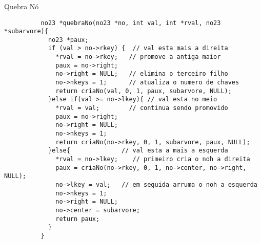 \documentclass[cyan,compress,aspectratio=43]{beamer}
\begin{document}
\begin{frame}[fragile]
\frametitle{}
      \vspace{-0.2cm}
	\begin{block}{Quebra Nó}
		\begin{lstlisting}
		  no23 *quebraNo(no23 *no, int val, int *rval, no23 *subarvore){
		    no23 *paux;
		    if (val > no->rkey) {  // val esta mais a direita
		      *rval = no->rkey;   // promove a antiga maior
		      paux = no->right;
		      no->right = NULL;   // elimina o terceiro filho
		      no->nkeys = 1;      // atualiza o numero de chaves
		      return criaNo(val, 0, 1, paux, subarvore, NULL);
		    }else if(val >= no->lkey){ // val esta no meio
		      *rval = val;        // continua sendo promovido
		      paux = no->right;
		      no->right = NULL;
		      no->nkeys = 1;
		      return criaNo(no->rkey, 0, 1, subarvore, paux, NULL);
		    }else{              // val esta a mais a esquerda
		      *rval = no->lkey;    // primeiro cria o noh a direita
		      paux = criaNo(no->rkey, 0, 1, no->center, no->right, NULL);
		      no->lkey = val;   // em seguida arruma o noh a esquerda
		      no->nkeys = 1;
		      no->right = NULL;
		      no->center = subarvore;
		      return paux;
		    }
		  }
	  \end{lstlisting}

  	\end{block}      
\end{frame}


%		
\end{document}
